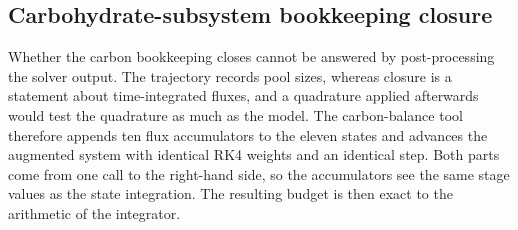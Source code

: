\subsection{Carbohydrate-subsystem bookkeeping closure}
\label{sec:carbon_closure}

Whether the carbon bookkeeping closes cannot be answered by post-processing the
solver output. The trajectory records pool sizes, whereas closure is a statement
about time-integrated fluxes, and a quadrature applied afterwards would test the
quadrature as much as the model. The carbon-balance tool therefore appends ten
flux accumulators to the eleven states and advances the augmented system with
identical RK4 weights and an identical step. Both parts come from one call to the
right-hand side, so the accumulators see the same stage values as the state
integration. The resulting budget is then exact to the arithmetic of the
integrator.

